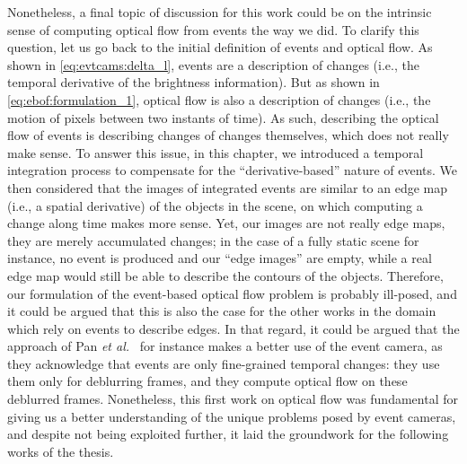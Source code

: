 Nonetheless, a final topic of discussion for this work could be on the intrinsic sense of computing optical flow from events the way we did. To clarify this question, let us go back to the initial definition of events and optical flow. As shown in \cref{eq:evtcams:delta_l}, events are a description of changes (i.e., the temporal derivative of the brightness information). But as shown in \cref{eq:ebof:formulation_1}, optical flow is also a description of changes (i.e., the motion of pixels between two instants of time). As such, describing the optical flow of events is describing changes of changes themselves, which does not really make sense. To answer this issue, in this chapter, we introduced a temporal integration process to compensate for the ``derivative-based'' nature of events. We then considered that the images of integrated events are similar to an edge map (i.e., a spatial derivative) of the objects in the scene, on which computing a change along time makes more sense. Yet, our images are not really edge maps, they are merely accumulated changes; in the case of a fully static scene for instance, no event is produced and our ``edge images'' are empty, while a real edge map would still be able to describe the contours of the objects. Therefore, our formulation of the event-based optical flow problem is probably ill-posed, and it could be argued that this is also the case for the other works in the domain which rely on events to describe edges. In that regard, it could be argued that the approach of Pan \textit{et al.}~\cite{Pan2020SingleIO} for instance makes a better use of the event camera, as they acknowledge that events are only fine-grained temporal changes: they use them only for deblurring frames, and they compute optical flow on these deblurred frames. Nonetheless, this first work on optical flow was fundamental for giving us a better understanding of the unique problems posed by event cameras, and despite not being exploited further, it laid the groundwork for the following works of the thesis.
